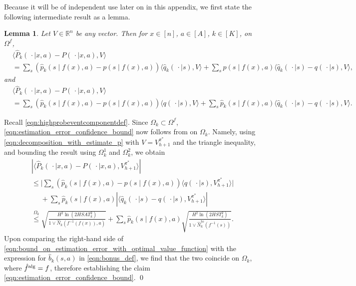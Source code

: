 \documentclass[11pt]{article}
\newcommand{\mbbR}{\mathbb{R}}
\newcommand{\alg}{\textnormal{alg}}
\newtheorem{lemma}[theorem]{Lemma}
\theoremstyle{definition}
\theoremstyle{definition}
\begin{document}
Because it will be of independent use later on in this appendix, we first state the following intermediate result as a lemma.
\begin{lemma}
	\label{lem:estimation_error_decomposition}
	Let $V\in\mbbR^n$ be any vector.
	Then for $x\in[n]$, $a\in[A]$, $k\in[K]$, on $\Omega^f$,
	\begin{align}
		\label{eqn:decomposition_with_estimate_q}
		 &
		\langle \hat{P}_k
		(\,\cdot \mid x,a)-P(\,\cdot \mid x,a), V\rangle
		\\
		 &
		=
		\sum_{s}
		(\hat{p}_k(s\mid f(x),a)-p(s\mid f(x),a))\langle \hat{q}_k(\,\cdot \mid s),V\rangle
		+
		\sum_{s}
		p(s\mid f(x),a)\langle \hat{q}_k(\,\cdot \mid s)-q(\,\cdot \mid s),V\rangle
		,
		\nonumber
	\end{align}
	and
	\begin{align}
		\label{eqn:decomposition_with_estimate_p}
		 &
		\langle \hat{P}_k
		(\,\cdot \mid x,a)-P(\,\cdot \mid x,a), V\rangle
		\\
		 &
		=
		\sum_{s}
		(\hat{p}_k(s\mid f(x),a)-p(s\mid f(x),a))\langle q(\,\cdot \mid s),V\rangle
		+
		\sum_{s}
		\hat{p}_k(s\mid f(x),a)\langle \hat{q}_k(\,\cdot \mid s)-q(\,\cdot \mid s),V\rangle
		.
		\nonumber
	\end{align}
\end{lemma}

Recall \eqref{eqn:highprobeventcomponentdef}.
Since $\Omega_k\subset\Omega^f$, \eqref{eqn:estimation_error_confidence_bound} now follows from  on $\Omega_k$.
Namely, using \eqref{eqn:decomposition_with_estimate_p} with $V=V_{h+1}^{\pi^*}$ and the triangle inequality, and bounding the result using $\Omega_k^1$ and $\Omega_k^2$, we obtain
\begin{align}
	 &
	|\langle \hat{P}_k(\,\cdot \mid x,a)-P(\,\cdot \mid x,a), V_{h+1}^{\pi^*}\rangle|
	\nonumber
	\\
	 &
	\leq
	\biggl|\sum_{s} (\hat{p}_k(s\mid f(x),a)-p(s\mid f(x),a)) \langle q(\,\cdot \mid s), V^{\pi^*}_{h+1}\rangle \biggr|
	\nonumber
	\\
	 &
	\phantom{\leq}
	+
	\sum_{s}
	\hat{p}_k(s\mid f(x),a)| \langle \hat{q}_k(\,\cdot \mid s)-q(\,\cdot \mid s),V^{\pi^*}_{h+1}\rangle|
	\nonumber
	\\
	 &
	\overset{\Omega_k}{\leq}
	\sqrt{\frac{H^2 \ln(2HSAT_k^2)}{1\vee \hat{N}_k(f^{-1}(f(x)),a)}}
	+
	\sum_{s}
	\hat{p}_k(s\mid f(x),a)
	\sqrt{\frac{H^2 \ln(2HST_k^2)}{1\vee \hat{N}^{\mathrm{to}}_k(f^{-1}(s))}}
	.
	\label{eqn:bound_on_estimation_error_with_optimal_value_function}
\end{align}
Upon comparing the right-hand side of \eqref{eqn:bound_on_estimation_error_with_optimal_value_function} with the expression for $\hat{b}_k(s,a)$ in \eqref{eqn:bonus_def}, we find that the two coincide on $\Omega_k$, where $\hat{f}^{\alg}=f$, therefore establishing the claim \eqref{eqn:estimation_error_confidence_bound}.
\qed
\end{document}
